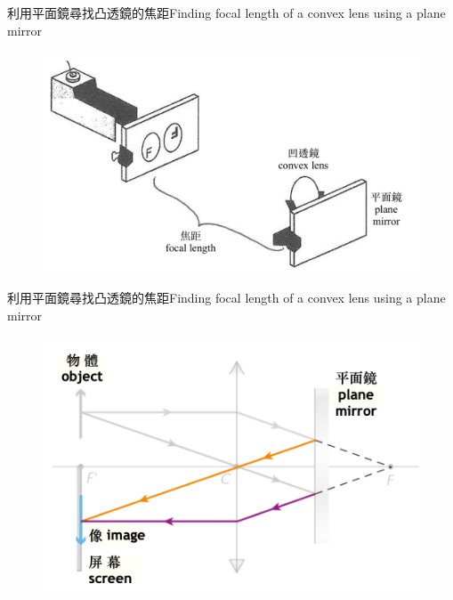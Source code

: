 \documentclass[beamer=true]{standalone}
\begin{document}
\begin{frame}{利用平面鏡尋找凸透鏡的焦距Finding focal length of a convex lens using a plane mirror}
    \begin{figure}
        \centering
        \includegraphics[width=0.75\linewidth]{../../assets/dd12cew8un9e8bew.png}


    \end{figure}
\end{frame}


\begin{frame}{利用平面鏡尋找凸透鏡的焦距Finding focal length of a convex lens using a plane mirror}
    \begin{figure}
        \centering
        \includegraphics[width=0.75\linewidth]{../../assets/denu98u23.png}


    \end{figure}
\end{frame}
\end{document}

